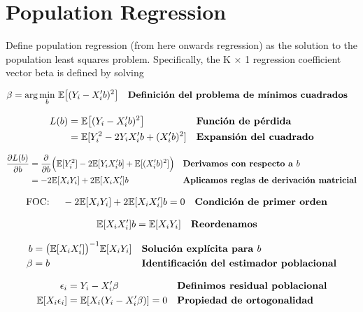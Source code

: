 \documentclass[12pt]{article}
\begin{document}
\section*{\noindent\textbf{Population Regression}}

Define population regression (from here onwards regression) as the solution to the population least squares problem. Specifically, the K × 1 regression coefficient vector beta is defined by solving

\singlespacing
\begin{align}
\beta &= \arg \min_b \, \mathbb{E}\big[(Y_i - X_i'b)^2\big] && \text{\textbf{Definición del problema de mínimos cuadrados}} 
\end{align}

\begin{align}
L(b) &= \mathbb{E}\big[(Y_i - X_i'b)^2\big] && \text{\textbf{Función de pérdida}} \\
     &= \mathbb{E}[Y_i^2 - 2Y_i X_i'b + (X_i'b)^2] && \text{\textbf{Expansión del cuadrado}} 
\end{align}

\begin{align}
\frac{\partial L(b)}{\partial b} 
    &= \frac{\partial}{\partial b} \Big( \mathbb{E}[Y_i^2] - 2\mathbb{E}[Y_i X_i'b] + \mathbb{E}[(X_i'b)^2] \Big) && \text{\textbf{Derivamos con respecto a $b$}} \\
    &= -2\mathbb{E}[X_i Y_i] + 2\mathbb{E}[X_i X_i']b && \text{\textbf{Aplicamos reglas de derivación matricial}} 
\end{align}

\begin{align}
\text{FOC: } &\quad -2\mathbb{E}[X_i Y_i] + 2\mathbb{E}[X_i X_i']b = 0 && \text{\textbf{Condición de primer orden}} 
\end{align}

\begin{align}
\mathbb{E}[X_i X_i']b &= \mathbb{E}[X_i Y_i] && \text{\textbf{Reordenamos}} 
\end{align}

\begin{align}
b &= \big(\mathbb{E}[X_i X_i']\big)^{-1}\mathbb{E}[X_i Y_i] && \text{\textbf{Solución explícita para $b$}} \\
\beta &= b && \text{\textbf{Identificación del estimador poblacional}} 
\end{align}

\begin{align}
\epsilon_i &= Y_i - X_i'\beta && \text{\textbf{Definimos residual poblacional}} \\
\mathbb{E}[X_i \epsilon_i] &= \mathbb{E}[X_i(Y_i - X_i'\beta)] = 0 && \text{\textbf{Propiedad de ortogonalidad}} 
\end{align}
\end{document}
